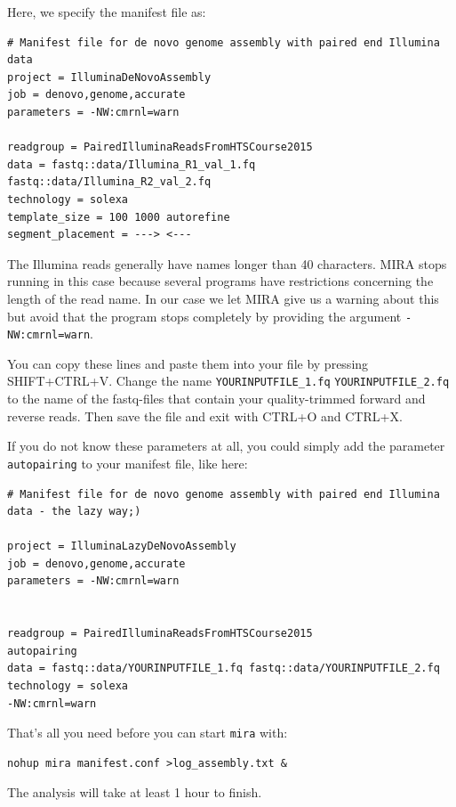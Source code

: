 \documentclass[11pt]{article}
\begin{document}
Here, we specify the manifest file as:


\begin{verbatim}
# Manifest file for de novo genome assembly with paired end Illumina data
project = IlluminaDeNovoAssembly
job = denovo,genome,accurate
parameters = -NW:cmrnl=warn

readgroup = PairedIlluminaReadsFromHTSCourse2015
data = fastq::data/Illumina_R1_val_1.fq fastq::data/Illumina_R2_val_2.fq
technology = solexa
template_size = 100 1000 autorefine
segment_placement = ---> <---
\end{verbatim}

The Illumina reads generally have names longer than 40
characters. MIRA stops running in this case because several programs
have restrictions concerning the length of the read name. In our case
we let MIRA give us a warning about this but avoid that the program
stops completely by providing the argument \texttt{-NW:cmrnl=warn}.


You can copy these lines and paste them into your file by pressing
SHIFT+CTRL+V. Change the name \texttt{YOURINPUTFILE\_1.fq}
\texttt{YOURINPUTFILE\_2.fq} to the name of the fastq-files that contain your
quality-trimmed forward and reverse reads. Then save the file and exit
with CTRL+O and CTRL+X.

If you do not know these parameters at all, you could simply add the
parameter \texttt{autopairing} to your manifest file, like here:

\begin{verbatim}
# Manifest file for de novo genome assembly with paired end Illumina data - the lazy way;)

project = IlluminaLazyDeNovoAssembly
job = denovo,genome,accurate
parameters = -NW:cmrnl=warn


readgroup = PairedIlluminaReadsFromHTSCourse2015
autopairing
data = fastq::data/YOURINPUTFILE_1.fq fastq::data/YOURINPUTFILE_2.fq
technology = solexa
-NW:cmrnl=warn
\end{verbatim}


That's all you need before you can start \texttt{mira} with:


\begin{verbatim}
nohup mira manifest.conf >log_assembly.txt &
\end{verbatim}


The analysis will take at least 1 hour to finish.
\end{document}
